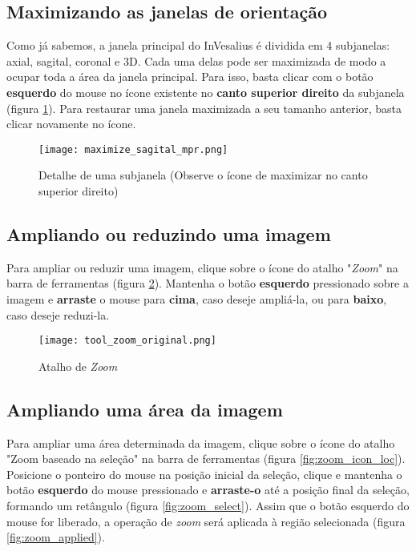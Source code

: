 \subsection{Maximizando as janelas de orientação}

Como já sabemos, a janela principal do InVesalius é dividida em 4 subjanelas: axial, sagital, coronal
e 3D. Cada uma delas pode ser maximizada de modo a ocupar toda a área da janela principal. Para isso,
basta clicar com o botão \textbf{esquerdo} do mouse no ícone existente no \textbf{canto superior direito}
da subjanela (figura \ref{fig:maximize_window}). Para restaurar uma janela maximizada a seu tamanho
anterior, basta clicar novamente no ícone.

\begin{figure}[!htb]
\centering
\texttt{[image: maximize\_sagital\_mpr.png]}
\caption{Detalhe de uma subjanela (Observe o ícone de maximizar no canto superior direito)}
\label{fig:maximize_window}
\end{figure}

\subsection{Ampliando ou reduzindo uma imagem}

Para ampliar ou reduzir uma imagem, clique sobre o ícone do atalho "\textit{Zoom}" na barra de
ferramentas (figura \ref{fig:zoom_icon}). Mantenha o botão \textbf{esquerdo} pressionado sobre
a imagem e \textbf{arraste} o mouse para \textbf{cima}, caso deseje ampliá-la, ou para \textbf{baixo},
caso deseje reduzi-la.

\begin{figure}[!htb]
\centering
\texttt{[image: tool\_zoom\_original.png]}
\caption{Atalho de \textit{Zoom}}
\label{fig:zoom_icon}
\end{figure}


\subsection{Ampliando uma área da imagem}

Para ampliar uma área determinada da imagem, clique sobre o ícone do atalho "Zoom baseado na seleção" 
na barra de ferramentas (figura \ref{fig:zoom_icon_loc}). Posicione o ponteiro do mouse na posição
inicial da seleção, clique e mantenha o botão \textbf{esquerdo} do mouse pressionado e \textbf{arraste-o}
até a posição final da seleção, formando um retângulo (figura \ref{fig:zoom_select}). Assim que o
botão esquerdo do mouse for liberado, a operação de \textit{zoom} será aplicada à região selecionada
(figura \ref{fig:zoom_applied}).


